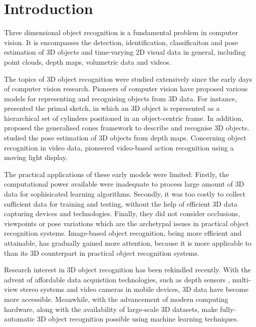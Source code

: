 \chapter{Introduction}
\label{chap/intro} 

Three dimensional object recognition is a fundamental problem in computer vision. It is encompasses the detection, identification, classificaiton and pose estimation of 3D objects and time-varying 2D visual data in general, including point clouds, depth maps, volumetric data and videos. 

The topics of 3D object recognition were studied extensively since the early days of computer vision research. 
Pioneers of computer vision have proposed various models for representing and recognising objects from 3D data.
For instance, \cite{Marr1978} presented the primal sketch, in which an 3D object is represented as a hierarchical set of cylinders positioned in an object-centric frame. 
In addition, \cite{Nevatia1977} proposed the generalised cones framework to describe and recognise 3D objects. \cite{Bolles1983} studied the pose estimation of 3D objects from depth maps.
Concerning object recognition in video data, \cite{Johansson1973} pioneered video-based action recognition using a moving light display. 

The practical applications of these early models were limited: Firstly, the computational power available were inadequate to process large amount of 3D data for sophisicated learning algorithms. Secondly, it was too costly to collect sufficient data for training and testing, without the help of efficient 3D data capturing devices and technologies. Finally, they did not consider occlusions, viewpoints or pose variations which are the archetypal issues in practical object recognition systems. Image-based object recognition, being more efficient and attainable, has gradually gained more attention, because it is more applicable to than its 3D counterpart in practical object recognition systems.   

Research interest in 3D object recognition has been rekindled recently. 
With the advent of affordable data acquistiion technologies, such as depth sensors \cite{Shotton2011}, multi-view stereo systems \cite{Vogiatzis2011} and video cameras in mobile devices, 3D data have become more accessible. Meanwhile, with the advancement of modern computing hardware, along with the availability of large-scale 3D datasets, make fully-automatic 3D object recognition possible using machine learning techniques.  

